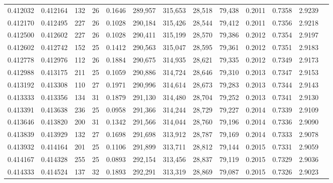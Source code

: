\begin{tabular}{rrrrrrrrrrrrr}
0.412032 & 0.412164 &    132 &    26 &                                     0.1646 & 289,957 & 315,653 &  28,518 &  79,438 & 0.2011 & 0.7358 & 2.9239 \\
0.412170 & 0.412495 &    227 &    26 &                                     0.1028 & 290,184 & 315,426 &  28,544 &  79,412 & 0.2011 & 0.7356 & 2.9218 \\
0.412500 & 0.412602 &    227 &    26 &                                     0.1028 & 290,411 & 315,199 &  28,570 &  79,386 & 0.2012 & 0.7354 & 2.9197 \\
0.412602 & 0.412742 &    152 &    25 &                                     0.1412 & 290,563 & 315,047 &  28,595 &  79,361 & 0.2012 & 0.7351 & 2.9183 \\
0.412778 & 0.412976 &    112 &    26 &                                     0.1884 & 290,675 & 314,935 &  28,621 &  79,335 & 0.2012 & 0.7349 & 2.9173 \\
0.412988 & 0.413175 &    211 &    25 &                                     0.1059 & 290,886 & 314,724 &  28,646 &  79,310 & 0.2013 & 0.7347 & 2.9153 \\
0.413192 & 0.413308 &    110 &    27 &                                     0.1971 & 290,996 & 314,614 &  28,673 &  79,283 & 0.2013 & 0.7344 & 2.9143 \\
0.413333 & 0.413356 &    134 &    31 &                                     0.1879 & 291,130 & 314,480 &  28,704 &  79,252 & 0.2013 & 0.7341 & 2.9130 \\
0.413391 & 0.413638 &    236 &    25 &                                     0.0958 & 291,366 & 314,244 &  28,729 &  79,227 & 0.2014 & 0.7339 & 2.9109 \\
0.413646 & 0.413820 &    200 &    31 &                                     0.1342 & 291,566 & 314,044 &  28,760 &  79,196 & 0.2014 & 0.7336 & 2.9090 \\
0.413839 & 0.413929 &    132 &    27 &                                     0.1698 & 291,698 & 313,912 &  28,787 &  79,169 & 0.2014 & 0.7333 & 2.9078 \\
0.413932 & 0.414164 &    201 &    25 &                                     0.1106 & 291,899 & 313,711 &  28,812 &  79,144 & 0.2015 & 0.7331 & 2.9059 \\
0.414167 & 0.414328 &    255 &    25 &                                     0.0893 & 292,154 & 313,456 &  28,837 &  79,119 & 0.2015 & 0.7329 & 2.9036 \\
0.414333 & 0.414524 &    137 &    32 &                                     0.1893 & 292,291 & 313,319 &  28,869 &  79,087 & 0.2015 & 0.7326 & 2.9023 \\

\end{tabular}
